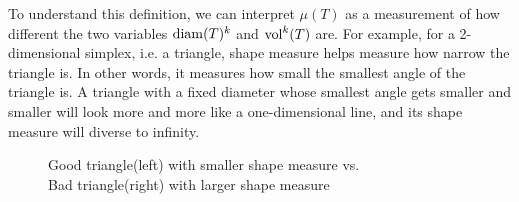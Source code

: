     To understand this definition, we can interpret $\mu(T)$ as a measurement of how different the two variables $\operatorname{diam}(T)^k$ and $\operatorname{vol}^k(T)$ are. For example, for a 2-dimensional simplex, i.e. a triangle, shape measure helps measure how narrow the triangle is. In other words, it measures how small the smallest angle of the triangle is. A triangle with a fixed diameter whose smallest angle gets smaller and smaller will look more and more like a one-dimensional line, and its shape measure will diverse to infinity.

    

    \begin{figure}
    \centering
    \captionsetup{justification=centering}
    \caption{Good triangle(left) with smaller shape measure vs. \\Bad triangle(right) with larger shape measure}
    \label{Fig1}
    \end{figure}


